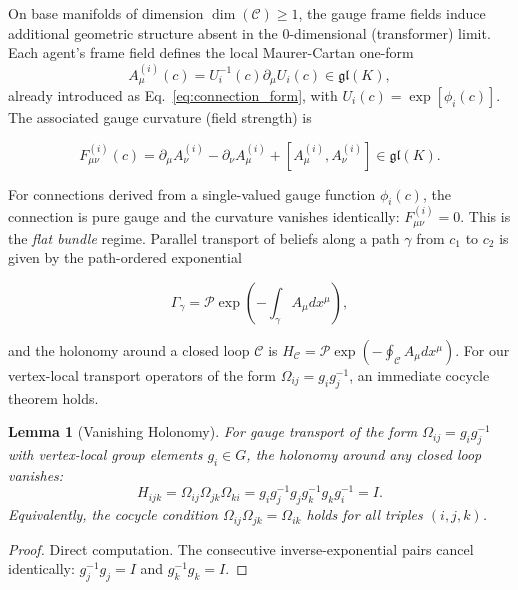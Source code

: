 \documentclass[11pt]{article}
\newtheorem{lemma}{Lemma}
\begin{document}
On base manifolds of dimension $\dim(\mathcal{C}) \geq 1$, the gauge frame fields induce additional geometric structure absent in the 0-dimensional (transformer) limit. Each agent's frame field defines the local Maurer-Cartan one-form
\begin{equation}
A_\mu^{(i)}(c) = U_i^{-1}(c)  \partial_\mu U_i(c) \in \mathfrak{gl}(K),
\end{equation}
already introduced as Eq.~\eqref{eq:connection_form}, with $U_i(c) = \exp[\phi_i(c)]$. The associated gauge curvature (field strength) is

\begin{equation}
F_{\mu\nu}^{(i)}(c) = \partial_\mu A_\nu^{(i)} - \partial_\nu A_\mu^{(i)} + [A_\mu^{(i)}, A_\nu^{(i)}] \in \mathfrak{gl}(K).
\label{eq:field_strength}
\end{equation}

For connections derived from a single-valued gauge function $\phi_i(c)$, the connection is pure gauge and the curvature vanishes identically: $F_{\mu\nu}^{(i)} = 0$. This is the \emph{flat bundle} regime. Parallel transport of beliefs along a path $\gamma$ from $c_1$ to $c_2$ is given by the path-ordered exponential

\begin{equation}
\Gamma_\gamma = \mathcal{P}\exp\left(-\int_\gamma A_\mu  dx^\mu\right),
\label{eq:parallel_transport}
\end{equation}

and the holonomy around a closed loop $\mathcal{C}$ is $H_{\mathcal{C}} = \mathcal{P}\exp(-\oint_{\mathcal{C}} A_\mu  dx^\mu)$. For our vertex-local transport operators of the form $\Omega_{ij} = g_i g_j^{-1}$, an immediate cocycle theorem holds.

\begin{lemma}[Vanishing Holonomy]
\label{thm:vanishing_holonomy}
For gauge transport of the form $\Omega_{ij} = g_ig_j^{-1}$ with vertex-local group elements $g_i \in G$, the holonomy around any closed loop vanishes:
\begin{equation}
H_{ijk} = \Omega_{ij}\Omega_{jk}\Omega_{ki}
= g_ig_j^{-1}g_jg_k^{-1}g_kg_i^{-1}
= I.
\label{eq:holonomy}
\end{equation}
Equivalently, the cocycle condition $\Omega_{ij}\Omega_{jk} = \Omega_{ik}$ holds for all triples $(i,j,k)$.
\end{lemma}

\begin{proof}
Direct computation. The consecutive inverse-exponential pairs cancel identically: $g_j^{-1} g_j = I$ and $g_k^{-1} g_k = I$.
\end{proof}
\end{document}
